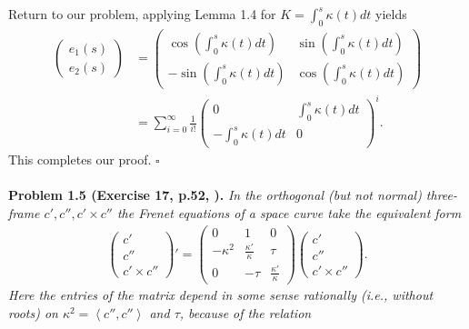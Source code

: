 \documentclass[a4paper]{article}
\numberwithin{equation}{section}
\begin{document}
Return to our problem, applying Lemma 1.4 for $K = \int_0^s {\kappa \left( t \right)dt} $ yields
\begin{align}
\left( {\begin{array}{*{20}{c}}
{{e_1}\left( s \right)}\\
{{e_2}\left( s \right)}
\end{array}} \right) &= \left( {\begin{array}{*{20}{c}}
{\cos \left( {\int_0^s {\kappa \left( t \right)dt} } \right)}&{\sin \left( {\int_0^s {\kappa \left( t \right)dt} } \right)}\\
{ - \sin \left( {\int_0^s {\kappa \left( t \right)dt} } \right)}&{\cos \left( {\int_0^s {\kappa \left( t \right)dt} } \right)}
\end{array}} \right)\\
& = \sum\limits_{i = 0}^\infty  {\frac{1}{{i!}}{{\left( {\begin{array}{*{20}{c}}
0&{\int_0^s {\kappa \left( t \right)dt} }\\
{ - \int_0^s {\kappa \left( t \right)dt} }&0
\end{array}} \right)}^i}} .
\end{align}
This completes our proof. \hfill $\square$\\
\\
\textbf{Problem 1.5 (Exercise 17, p.52, \cite{1}).} \textit{In the orthogonal (but not normal) three-frame $c',c'',c'\times c''$ the Frenet equations of a space curve take the equivalent form}
\begin{align}
\label{1.35}
\left( {\begin{array}{*{20}{c}}
{c'}\\
{c''}\\
{c' \times c''}
\end{array}} \right)' = \left( {\begin{array}{*{20}{c}}
0&1&0\\
{ - {\kappa ^2}}&{\frac{{\kappa '}}{\kappa }}&\tau \\
0&{ - \tau }&{\frac{{\kappa '}}{\kappa }}
\end{array}} \right)\left( {\begin{array}{*{20}{c}}
{c'}\\
{c''}\\
{c' \times c''}
\end{array}} \right).
\end{align}
\textit{Here the entries of the matrix depend in some sense rationally (i.e., without roots) on ${\kappa ^2} = \left\langle {c'',c''} \right\rangle $ and $\tau$, because of the relation}
\end{document}
